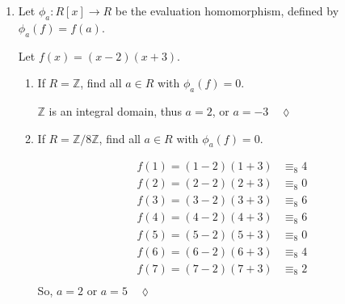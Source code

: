 \documentclass{article}
\newcommand\Z{\mathbb{Z}}
\begin{document}
\begin{enumerate}
\item Let $\phi_a: R[x] \to R$ be the evaluation homomorphism, defined
  by $\phi_a(f) = f(a)$.

  Let $f(x) = (x-2)(x+3)$.
\begin{enumerate}
\item If $R = \Z$, find all $a \in R$ with $\phi_a(f) = 0$.

   $\Z$ is an integral domain, thus $a= 2$, or $a =
  -3\quad \lozenge$

\item If $R = \Z/8\Z$, find all $a \in R$ with $\phi_a(f) = 0$.

  \begin{align*}
    f(1) = (1-2)(1+3) &\equiv_8 4\\
    f(2) = (2-2)(2+3) &\equiv_8 0\\
    f(3) = (3-2)(3+3) &\equiv_8 6\\
    f(4) = (4-2)(4+3) &\equiv_8 6 \\
    f(5) = (5-2)(5+3) &\equiv_8 0\\
    f(6) = (6-2)(6+3) &\equiv_8 4\\
    f(7) = (7-2)(7+3) &\equiv_8 2\\
  \end{align*}
  So, $a = 2$ or $a = 5\quad \lozenge$
\end{enumerate}


\end{enumerate}
\end{document}
